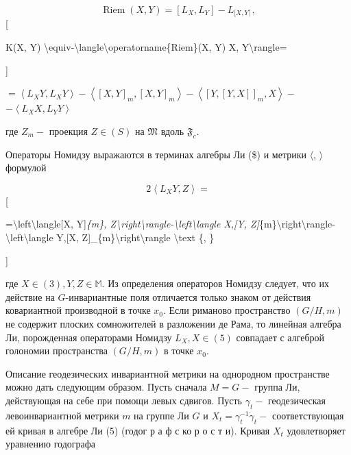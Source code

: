 \documentclass[10pt]{article}
\begin{document}
\[

\operatorname{Riem}(X, Y)=\left[L_{X}, L_{Y}\right]-L_{[X, Y\rceil},

\][



K(X, Y) \textbackslash equiv-\textbackslash langle\textbackslash operatorname\{Riem\}(X, Y) X, Y\textbackslash rangle=

]



$=\left\langle L_{X} Y, L_{X} Y\right\rangle-\left\langle[X, Y]_{m},[X, Y]_{m}\right\rangle-\left\langle[Y,[Y, X]]_{m}, X\right\rangle-$ $-\left\langle L_{X} X, L_{Y} Y\right\rangle$



где $Z_{m}-$ проекция $Z \in(S)$ на $\mathfrak{M}$ вдоль $\mathfrak{F}_{c}$.



Операторы Номидзу выражаются в терминах алгебры Ли (\$) и метрики $\langle$, $\rangle$ формулой



\[

2\left\langle L_{X} Y, Z\right\rangle=

\][



=\textbackslash left\textbackslash langle[X, Y]\textit{\{m\}, Z\textbackslash right\textbackslash rangle-\textbackslash left\textbackslash langle X,[Y, Z]}\{m\}\textbackslash right\textbackslash rangle-\textbackslash left\textbackslash langle Y,[X, Z]\_\{m\}\textbackslash right\textbackslash rangle \textbackslash text \{, \}

]



где $X \in(3), Y, Z \in \mathbb{M}$. Из определения операторов Номидзу следует, что их действие на $G$-инвариантные поля отличается только знаком от действия ковариантной производной в точке $x_{0}$. Если риманово пространство $(G / H, m)$ не содержит плоских сомножителей в разложении де Рама, то линейная алгебра Ли, порожденная операторами Номидзу $L_{X}, X \in(5)$ совпадает с алгеброй голономии пространства $(G / H, m)$ в точке $x_{0}$.



Описание геодезических инвариантной метрики на однородном пространстве можно дать следующим образом. Пусть сначала $M=G-$ группа Ли, действующая на себе при помощи левых сдвигов. Пусть $\gamma_{t}-$ геодезическая левоинвариантной метрики $m$ на группе Ли $G$ и $X_{t}=\gamma_{t}^{-1} \dot{\gamma}_{t}-$ соответствующая ей кривая в алгебре Ли (5) (годог р а ф с ко р о с т и). Кривая $X_{t}$ удовлетворяет уравнению годографа
\end{document}
